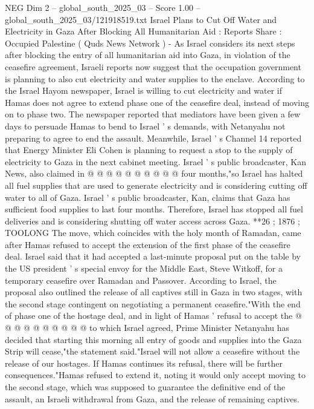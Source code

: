 \begin{textsample}{NEG Dim 2 – global\_south\_2025\_03 – Score 1.00 – global\_south\_2025\_03/121918519.txt}  \label{ex:f2_neg_160}
Israel Plans to Cut Off Water and Electricity in Gaza After Blocking All Humanitarian Aid : Reports Share : Occupied Palestine ( Quds News Network ) - As Israel considers its next steps after blocking the entry of all humanitarian aid into Gaza, in violation of the ceasefire agreement, Israeli reports now suggest that the occupation government is planning to also cut electricity and water supplies to the enclave.
According to the Israel Hayom newspaper, Israel is willing to cut electricity and water if Hamas does not agree to extend phase one of the ceasefire deal, instead of moving on to phase two.
The newspaper reported that mediators have been given a few days to persuade Hamas to bend to Israel ' s demands, with Netanyahu not preparing to agree to end the assault.
Meanwhile, Israel ' s Channel 14 reported that Energy Minister Eli Cohen is planning to request a stop to the supply of electricity to Gaza in the next cabinet meeting.
Israel ' s public broadcaster, Kan News, also claimed in @ @ @ @ @ @ @ @ @ @ four months,"so Israel has halted all fuel supplies that are used to generate electricity and is considering cutting off water to all of Gaza.
Israel ' s public broadcaster, Kan, claims that Gaza has sufficient food supplies to last four months.
Therefore, Israel has stopped all fuel deliveries and is considering shutting off water access across Gaza. **26 ; 1876 ; TOOLONG The move, which coincides with the holy month of Ramadan, came after Hamas refused to accept the extension of the first phase of the ceasefire deal.
Israel said that it had accepted a last-minute proposal put on the table by the US president ' s special envoy for the Middle East, Steve Witkoff, for a temporary ceasefire over Ramadan and Passover.
According to Israel, the proposal also outlined the release of all captives still in Gaza in two stages, with the second stage contingent on negotiating a permanent ceasefire."With the end of phase one of the hostage deal, and in light of Hamas ' refusal to accept the @ @ @ @ @ @ @ @ @ @ to which Israel agreed, Prime Minister Netanyahu has decided that starting this morning all entry of goods and supplies into the Gaza Strip will cease,"the statement said."Israel will not allow a ceasefire without the release of our hostages.
If Hamas continues its refusal, there will be further consequences."Hamas refused to extend it, noting it would only accept moving to the second stage, which was supposed to guarantee the definitive end of the assault, an Israeli withdrawal from Gaza, and the release of remaining captives.

\end{textsample}
